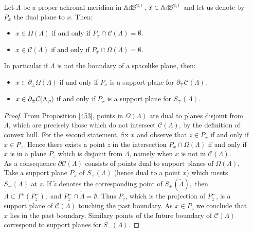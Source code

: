 \begin{proposition}\label{464}
Let $\Lambda$ be a proper achronal meridian in $\mathbb{A}\mathrm{d}\mathbb{S}^{2,1}$, $x\in\mathbb{A}\mathrm{d}\mathbb{S}^{2,1}$ and let us denote by $P_x$ the dual plane to $x$. Then: 
\begin{itemize}
    \item $x\in\Omega(\Lambda)$ if and only if $P_x\cap\mathcal{C}(\Lambda)=\emptyset$. 
    \item $x\in\mathcal{C}(\Lambda)$ if and only if $P_x\cap \Omega(\Lambda)=\emptyset$.
\end{itemize} 
In particular if $\Lambda$ is not the boundary of a spacelike plane, then: 
\begin{itemize}
    \item $x\in\partial_\pm\Omega(\Lambda)$ if and only if $P_x$ is a support plane for $\partial_\mp\mathcal{C}(\Lambda).$
    \item $x\in\partial_\pm\mathcal{C}(\Lambda_\varphi)$ if and only if $P_x$ is a support plane for $S_\mp(\Lambda)$.
\end{itemize}
\end{proposition}
\begin{proof}
From Proposition \ref{453}, points in $\Omega(\Lambda)$ are dual to planes disjoint from $\Lambda$, which are precisely those which do not intersect $\mathcal{C}(\Lambda)$, by the definition of convex hull. For the second statement, fix $x$ and observe that $z\in P_x$ if and only if $x\in P_z$. Hence there exists a point $z$ in the intersection $P_x\cap \Omega(\Lambda)$ if and only if $x$ is in a plane $P_z$ which is disjoint from $\Lambda$, namely when $x$ is not in $\mathcal{C}(\Lambda)$. \\
As a consequence $\partial\mathcal{C}(\Lambda)$ consists of points dual to support planes of $\Omega(\Lambda)$. Take a support plane $P_x$ of $S_+(\Lambda)$ (hence dual to a point $x$) which meets $S_+(\Lambda)$ at $z$. If $\widetilde{z}$ denotes the corresponding point of $S_+(\widetilde{\Lambda}),$ then $\widetilde{\Lambda}\subset I^+(P_{\widetilde{z}}^-),$ and $P_{\widetilde{z}}^-\cap\widetilde{\Lambda}=\emptyset.$ Thus $P_z$, which is the projection of $P_{\widetilde{z}}^-$, is a support plane of $\mathcal{C}(\Lambda)$ touching the past boundary. As $x\in P_z$ we conclude that $x$ lies in the past boundary. Similary points of the future boundary of $\mathcal{C}(\Lambda)$ correspond to support planes for $S_-(\Lambda)$.
\end{proof}

